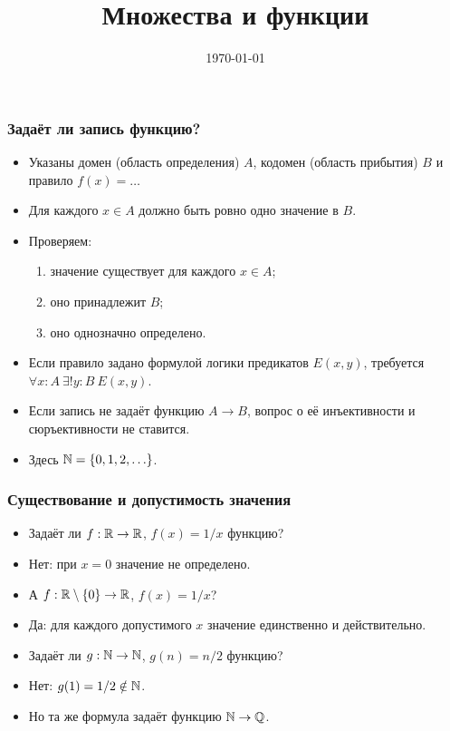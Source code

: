\documentclass[10pt]{beamer}
\title{Множества и функции}
\date{\today}
\begin{document}
\begin{frame}[plain]
    \maketitle
\end{frame}

\begin{frame}
    \frametitle{Задаёт ли запись функцию?}
    \begin{itemize}
        \item Указаны домен (область определения) $A$, кодомен (область прибытия) $B$ и правило $f(x)=\ldots$
        \item Для каждого $x\in A$ должно быть ровно одно значение в $B$.
        \item<2-> Проверяем:
        \begin{enumerate}
            \item<2-> значение существует для каждого $x\in A$;
            \item<3-> оно принадлежит $B$;
            \item<4-> оно однозначно определено.
        \end{enumerate}
        \item<5-> Если правило задано формулой логики предикатов $E(x,y)$, требуется $\forall x:A~\exists!y:B~E(x,y)$.
        \item<6-> Если запись не задаёт функцию $A\to B$, вопрос о её инъективности и сюръективности не ставится.
        \item Здесь $\mathbb{N}=\{0,1,2,\ldots\}$.
    \end{itemize}
\end{frame}

\begin{frame}
    \frametitle{Существование и допустимость значения}
    \begin{itemize}
        \item Задаёт ли $f:\mathbb{R}\to\mathbb{R}$, $f(x)=1/x$ функцию?
        \item<2-> Нет: при $x=0$ значение не определено.
        \item<3-> А $f:\mathbb{R}\setminus\{0\}\to\mathbb{R}$, $f(x)=1/x$?
        \item<4-> Да: для каждого допустимого $x$ значение единственно и действительно.
        \item<5-> Задаёт ли $g:\mathbb{N}\to\mathbb{N}$, $g(n)=n/2$ функцию?
        \item<6-> Нет: $g(1)=1/2\notin\mathbb{N}$.
        \item<7-> Но та же формула задаёт функцию $\mathbb{N}\to\mathbb{Q}$.
    \end{itemize}
\end{frame}
\end{document}
